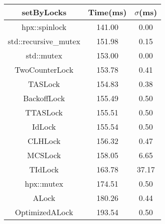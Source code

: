 \begin{tabular}{|c|c|c|}
\hline
\textbf{setByLocks} & \textbf{Time(ms)} & \textbf{$\sigma$(ms)} \\
\hline
hpx::spinlock & 141.00 & 0.00 \\
\hline
std::recursive_mutex & 151.98 & 0.15 \\
\hline
std::mutex & 153.00 & 0.00 \\
\hline
TwoCounterLock & 153.78 & 0.41 \\
\hline
TASLock & 154.83 & 0.38 \\
\hline
BackoffLock & 155.49 & 0.50 \\
\hline
TTASLock & 155.51 & 0.50 \\
\hline
IdLock & 155.54 & 0.50 \\
\hline
CLHLock & 156.32 & 0.47 \\
\hline
MCSLock & 158.05 & 6.65 \\
\hline
TIdLock & 163.78 & 37.17 \\
\hline
hpx::mutex & 174.51 & 0.50 \\
\hline
ALock & 180.26 & 0.44 \\
\hline
OptimizedALock & 193.54 & 0.50 \\
\hline
\end{tabular}
